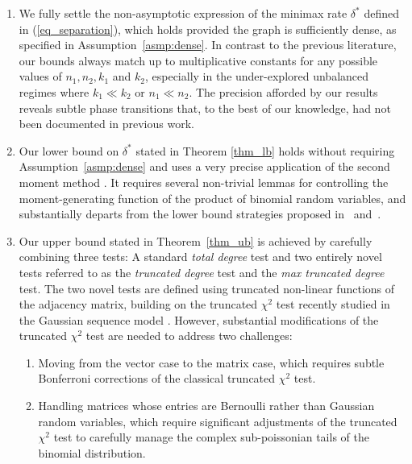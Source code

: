 \documentclass{article}
\begin{document}
 \begin{enumerate}
     \item We fully settle the non-asymptotic expression of the minimax rate $\delta^*$ defined in (\ref{eq_separation}), which holds provided the graph is sufficiently dense, as specified in Assumption~\ref{asmp:dense}. 
     In contrast to the previous literature, our bounds always match up to multiplicative constants for any possible values of $n_1,n_2,k_1$ and $k_2$, especially in the under-explored unbalanced regimes where $k_1 \ll k_2$ or $n_1 \ll n_2$. 
     The precision afforded by our results reveals subtle phase transitions that, to the best of our knowledge, had not been documented in previous work. 
     
     \item Our lower bound on $\delta^*$ stated in Theorem \ref{thm_lb} holds without requiring Assumption~\ref{asmp:dense} and uses a very precise application of the second moment method \cite{lecam1973convergence}. 
     It requires several non-trivial lemmas for controlling the moment-generating function of the product of binomial random variables, and substantially departs from the lower bound strategies proposed in~\cite{butucea2013detection} and~\cite{arias2014community}.
     \item Our upper bound stated in Theorem~\ref{thm_ub} is achieved by carefully %
     combining three tests: A standard \textit{total degree} test and two entirely novel tests referred to as the \textit{truncated degree} test and the \textit{max truncated degree} test. 
     The two novel tests are defined using truncated non-linear functions of the adjacency matrix, building on the truncated $\chi^2$ test recently studied in the Gaussian sequence model \cite{collier2017minimax, kotekal2023minimax, liu2021minimax,chhor2024sparse}. 
     However, substantial modifications of the truncated $\chi^2$ test are needed to address two challenges:
     \begin{enumerate}
         \item Moving from the vector case to the matrix case, which requires subtle Bonferroni corrections of the classical truncated $\chi^2$ test.
         \item Handling matrices whose entries are Bernoulli rather than Gaussian random variables, which require significant adjustments of the truncated $\chi^2$ test to carefully manage the complex sub-poissonian tails of the binomial distribution.

\end{enumerate}
\end{enumerate}
\end{document}
